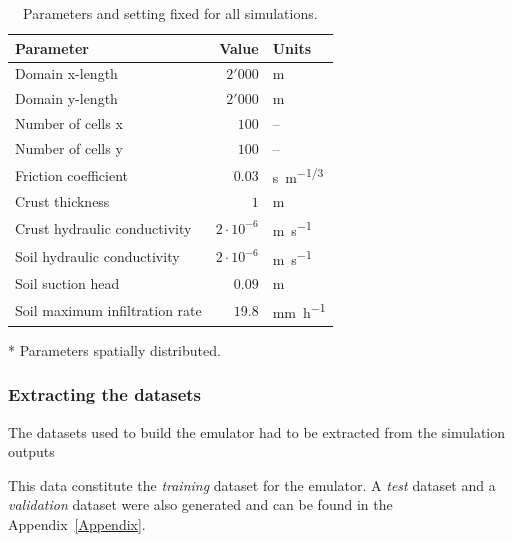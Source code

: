 \begin{table}[htpb]
  \centering
  \caption{Parameters and setting fixed for all simulations.}
  \label{tab:simulations_parameters}
  \begin{threeparttable}
    \begin{tabular}{lrl}
      \toprule
      \textbf{Parameter} & \textbf{Value} & \textbf{Units} \\
      \midrule
      Domain x-length                          &    $2'000$           & \si{\meter}   \\
      Domain y-length                          &    $2'000$           & \si{\meter}   \\
      Number of cells x                        &    $100$             & --   \\
      Number of cells y                        &    $100$             & --   \\
      Friction coefficient\tnote{*}            &    $0.03$            & \si{s.m^{-1/3}}\\
      Crust thickness\tnote{*}                 &    $1$               & \si{\meter}\\
      Crust hydraulic conductivity\tnote{*}    &    $2\cdot 10^{-6}$  & \si{\meter\per\second}\\
      Soil hydraulic conductivity\tnote{*}     &    $2\cdot 10^{-6}$  & \si{\meter\per\second}\\
      Soil suction head\tnote{*}               &    $0.09$      & \si{\meter}\\
      Soil maximum infiltration rate\tnote{*}  &    $19.8$      & \si{\milli\meter\per\hour}\\
      \bottomrule
    \end{tabular}
    \begin{tablenotes}
      \item[*] Parameters spatially distributed.
    \end{tablenotes}
  \end{threeparttable}
\end{table}


\subsubsection{Extracting the datasets}

The datasets used to build the emulator had to be extracted from the simulation outputs

This data constitute the \emph{training} dataset for the emulator.
A \emph{test} dataset and a \emph{validation} dataset were also generated and can be found in the Appendix~\ref{Appendix}. 



